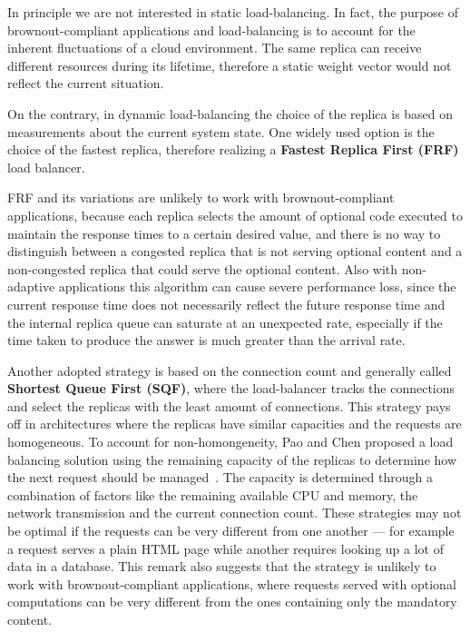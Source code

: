 In principle we are not interested in static load-balancing. In fact,
the purpose of brownout-compliant applications and load-balancing is
to account for the inherent fluctuations of a cloud environment. The
same replica can receive different resources during its lifetime,
therefore a static weight vector would not reflect the current
situation.

On the contrary, in dynamic load-balancing the choice of the replica
is based on measurements about the current system state. One widely
used option is the choice of the fastest replica, therefore realizing
a \textbf{Fastest Replica First (FRF)} load balancer.  

FRF and its variations are unlikely to work with brownout-compliant
applications, because each replica selects the amount of optional code
executed to maintain the response times to a certain desired value,
and there is no way to distinguish between a congested replica that is
not serving optional content and a non-congested replica that could
serve the optional content. Also with non-adaptive applications this
algorithm can cause severe performance loss, since the current
response time does not necessarily reflect the future response time
and the internal replica queue can saturate at an unexpected rate,
especially if the time taken to produce the answer is much greater
than the arrival rate.

Another adopted strategy is based on the connection count and
generally called \textbf{Shortest Queue First (SQF)}, where the
load-balancer tracks the connections and select the replicas with the
least amount of connections. This strategy pays off in architectures
where the replicas have similar capacities and the requests are
homogeneous. To account for non-homongeneity, Pao and Chen proposed a
load balancing solution using the remaining capacity of the replicas
to determine how the next request should be
managed~\cite{feedbackintensive}. The capacity is determined through a
combination of factors like the remaining available CPU and memory,
the network transmission and the current connection count.  These
strategies may not be optimal if the requests can be very different
from one another --- for example a request serves a plain HTML page
while another requires looking up a lot of data in a database. This
remark also suggests that the strategy is unlikely to work with
brownout-compliant applications, where requests served with optional
computations can be very different from the ones containing only the
mandatory content.

